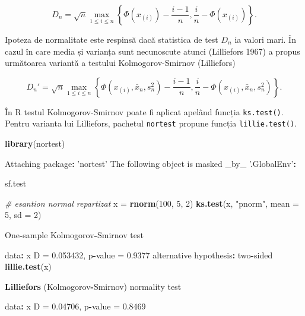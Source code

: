 \documentclass[]{article}
\newenvironment{Shaded}{\begin{snugshade}}{\end{snugshade}}
\newcommand{\KeywordTok}[1]{\textcolor[rgb]{0.13,0.29,0.53}{\textbf{#1}}}
\newcommand{\DataTypeTok}[1]{\textcolor[rgb]{0.13,0.29,0.53}{#1}}
\newcommand{\DecValTok}[1]{\textcolor[rgb]{0.00,0.00,0.81}{#1}}
\newcommand{\FloatTok}[1]{\textcolor[rgb]{0.00,0.00,0.81}{#1}}
\newcommand{\StringTok}[1]{\textcolor[rgb]{0.31,0.60,0.02}{#1}}
\newcommand{\CommentTok}[1]{\textcolor[rgb]{0.56,0.35,0.01}{\textit{#1}}}
\newcommand{\OperatorTok}[1]{\textcolor[rgb]{0.81,0.36,0.00}{\textbf{#1}}}
\newcommand{\NormalTok}[1]{#1}
\begin{document}
\[
  D_n = \sqrt{n}\max_{1\leq i\leq n}\left\{\Phi(x_{(i)})-\frac{i-1}{n}, \frac{i}{n} - \Phi(x_{(i)})\right\}.
\]

Ipoteza de normalitate este respinsă dacă statistica de test \(D_n\) ia
valori mari. În cazul în care media și varianța sunt necunoscute atunci
(Lilliefors 1967) a propus următoarea variantă a testului
Kolmogorov-Smirnov (Lilliefors)

\[
  D_n' = \sqrt{n}\max_{1\leq i\leq n}\left\{\Phi(x_{(i)}, \bar{x}_n, s_n^2)-\frac{i-1}{n}, \frac{i}{n} - \Phi(x_{(i)}, \bar{x}_n, s_n^2)\right\}.
\]

În R testul Kolmogorov-Smirnov poate fi aplicat apelând funcția
\texttt{ks.test()}. Pentru varianta lui Lilliefors, pachetul
\texttt{nortest} propune funcția \texttt{lillie.test()}.

\begin{Shaded}
\begin{Highlighting}[]
\KeywordTok{library}\NormalTok{(nortest)}

\NormalTok{Attaching package}\OperatorTok{:}\StringTok{ 'nortest'}
\NormalTok{The following object is masked _by_ }\StringTok{'.GlobalEnv'}\OperatorTok{:}

\StringTok{    }\NormalTok{sf.test}

\CommentTok{# esantion normal repartizat }
\NormalTok{x =}\StringTok{ }\KeywordTok{rnorm}\NormalTok{(}\DecValTok{100}\NormalTok{, }\DecValTok{5}\NormalTok{, }\DecValTok{2}\NormalTok{)}
\KeywordTok{ks.test}\NormalTok{(x, }\StringTok{"pnorm"}\NormalTok{, }\DataTypeTok{mean =} \DecValTok{5}\NormalTok{, }\DataTypeTok{sd =} \DecValTok{2}\NormalTok{)}

\NormalTok{    One}\OperatorTok{-}\NormalTok{sample Kolmogorov}\OperatorTok{-}\NormalTok{Smirnov test}

\NormalTok{data}\OperatorTok{:}\StringTok{  }\NormalTok{x}
\NormalTok{D =}\StringTok{ }\FloatTok{0.053432}\NormalTok{, p}\OperatorTok{-}\NormalTok{value =}\StringTok{ }\FloatTok{0.9377}
\NormalTok{alternative hypothesis}\OperatorTok{:}\StringTok{ }\NormalTok{two}\OperatorTok{-}\NormalTok{sided}
\KeywordTok{lillie.test}\NormalTok{(x)}

    \KeywordTok{Lilliefors}\NormalTok{ (Kolmogorov}\OperatorTok{-}\NormalTok{Smirnov) normality test}

\NormalTok{data}\OperatorTok{:}\StringTok{  }\NormalTok{x}
\NormalTok{D =}\StringTok{ }\FloatTok{0.04706}\NormalTok{, p}\OperatorTok{-}\NormalTok{value =}\StringTok{ }\FloatTok{0.8469}


\end{Highlighting}
\end{Shaded}
\end{document}

